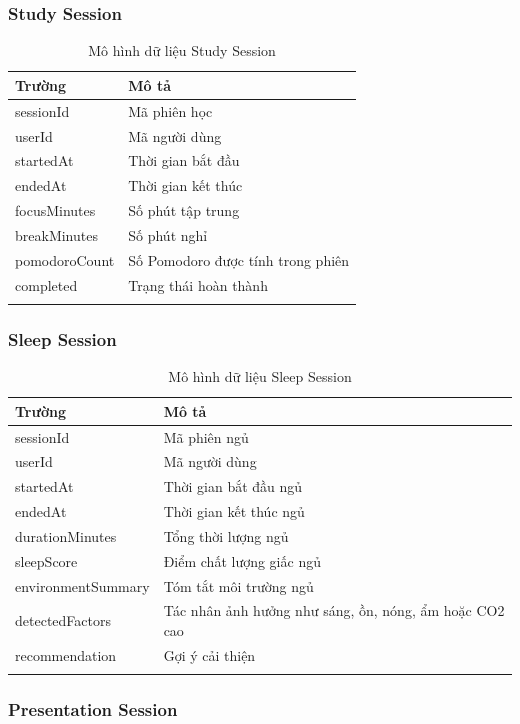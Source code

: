 \documentclass[12pt,a4paper]{article}
\begin{document}
\subsubsection{Study Session}

\begin{longtable}{|P{4cm}|P{10cm}|}
\hline
\textbf{Trường} & \textbf{Mô tả} \\
\hline
sessionId & Mã phiên học \\
\hline
userId & Mã người dùng \\
\hline
startedAt & Thời gian bắt đầu \\
\hline
endedAt & Thời gian kết thúc \\
\hline
focusMinutes & Số phút tập trung \\
\hline
breakMinutes & Số phút nghỉ \\
\hline
pomodoroCount & Số Pomodoro được tính trong phiên \\
\hline
completed & Trạng thái hoàn thành \\
\hline
\caption{Mô hình dữ liệu Study Session}
\end{longtable}

\subsubsection{Sleep Session}

\begin{longtable}{|P{4cm}|P{10cm}|}
\hline
\textbf{Trường} & \textbf{Mô tả} \\
\hline
sessionId & Mã phiên ngủ \\
\hline
userId & Mã người dùng \\
\hline
startedAt & Thời gian bắt đầu ngủ \\
\hline
endedAt & Thời gian kết thúc ngủ \\
\hline
durationMinutes & Tổng thời lượng ngủ \\
\hline
sleepScore & Điểm chất lượng giấc ngủ \\
\hline
environmentSummary & Tóm tắt môi trường ngủ \\
\hline
detectedFactors & Tác nhân ảnh hưởng như sáng, ồn, nóng, ẩm hoặc CO2 cao \\
\hline
recommendation & Gợi ý cải thiện \\
\hline
\caption{Mô hình dữ liệu Sleep Session}
\end{longtable}

\subsubsection{Presentation Session}
\end{document}
